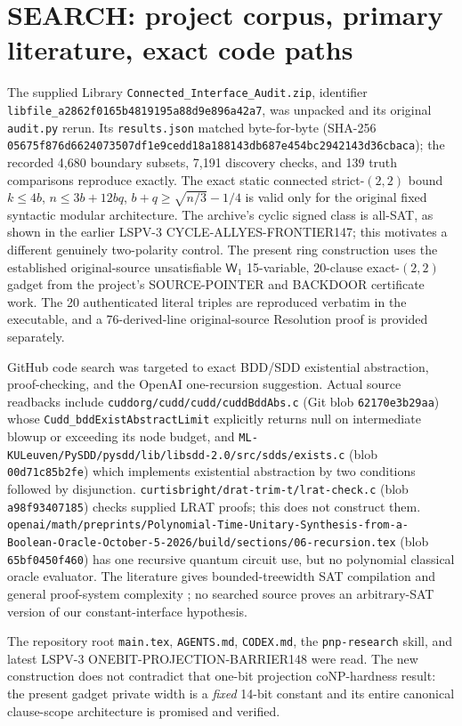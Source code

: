 \documentclass[11pt]{article}
\newcommand{\W}{\mathsf{W}}
\begin{document}
\section{SEARCH: project corpus, primary literature, exact code paths}
The supplied Library \texttt{Connected\_Interface\_Audit.zip}, identifier \texttt{libfile\_a2862f0165b4819195a88d9e896a42a7}, was unpacked and its original \texttt{audit.py} rerun. Its \texttt{results.json} matched byte-for-byte (SHA-256 \texttt{05675f876d6624073507df1e9cedd18a188143db687e454bc2942143d36cbaca}); the recorded 4,680 boundary subsets, 7,191 discovery checks, and 139 truth comparisons reproduce exactly. The exact static connected strict-$(2,2)$ bound $k\le4b$, $n\le3b+12bq$, $b+q\ge\sqrt{n/3}-1/4$ is valid only for the original fixed syntactic modular architecture. The archive's cyclic signed class is all-SAT, as shown in the earlier LSPV-3 CYCLE-ALLYES-FRONTIER147; this motivates a different genuinely two-polarity control. The present ring construction uses the established original-source unsatisfiable $\W_1$ 15-variable, 20-clause exact-$(2,2)$ gadget from the project's SOURCE-POINTER and BACKDOOR certificate work. The 20 authenticated literal triples are reproduced verbatim in the executable, and a 76-derived-line original-source Resolution proof is provided separately.

GitHub code search was targeted to exact BDD/SDD existential abstraction, proof-checking, and the OpenAI one-recursion suggestion. Actual source readbacks include \texttt{cuddorg/cudd/cudd/cuddBddAbs.c} (Git blob \texttt{62170e3b29aa}) whose \texttt{Cudd\_bddExistAbstractLimit} explicitly returns null on intermediate blowup or exceeding its node budget, and \texttt{ML-KULeuven/PySDD/pysdd/lib/libsdd-2.0/src/sdds/exists.c} (blob \texttt{00d71c85b2fe}) which implements existential abstraction by two conditions followed by disjunction. \texttt{curtisbright/drat-trim-t/lrat-check.c} (blob \texttt{a98f93407185}) checks supplied LRAT proofs; this does not construct them. \texttt{openai/math/preprints/Polynomial-Time-Unitary-Synthesis-from-a-Boolean-Oracle-October-5-2026/build/sections/06-recursion.tex} (blob \texttt{65bf0450f460}) has one recursive quantum circuit use, but no polynomial classical oracle evaluator. The literature gives bounded-treewidth SAT compilation and general proof-system complexity \cite{samer2010,darwiche2002,cook1979}; no searched source proves an arbitrary-SAT version of our constant-interface hypothesis.

The repository root \texttt{main.tex}, \texttt{AGENTS.md}, \texttt{CODEX.md}, the \texttt{pnp-research} skill, and latest LSPV-3 ONEBIT-PROJECTION-BARRIER148 were read. The new construction does not contradict that one-bit projection coNP-hardness result: the present gadget private width is a \emph{fixed} 14-bit constant and its entire canonical clause-scope architecture is promised and verified.
\end{document}

